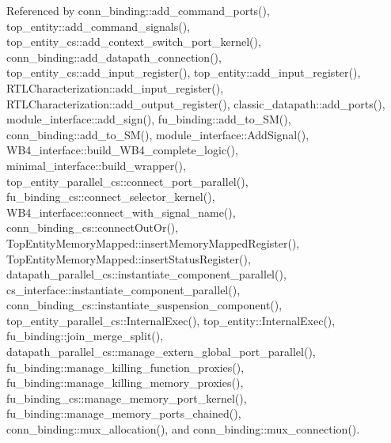 Referenced by conn\+\_\+binding\+::add\+\_\+command\+\_\+ports(), top\+\_\+entity\+::add\+\_\+command\+\_\+signals(), top\+\_\+entity\+\_\+cs\+::add\+\_\+context\+\_\+switch\+\_\+port\+\_\+kernel(), conn\+\_\+binding\+::add\+\_\+datapath\+\_\+connection(), top\+\_\+entity\+\_\+cs\+::add\+\_\+input\+\_\+register(), top\+\_\+entity\+::add\+\_\+input\+\_\+register(), R\+T\+L\+Characterization\+::add\+\_\+input\+\_\+register(), R\+T\+L\+Characterization\+::add\+\_\+output\+\_\+register(), classic\+\_\+datapath\+::add\+\_\+ports(), module\+\_\+interface\+::add\+\_\+sign(), fu\+\_\+binding\+::add\+\_\+to\+\_\+\+S\+M(), conn\+\_\+binding\+::add\+\_\+to\+\_\+\+S\+M(), module\+\_\+interface\+::\+Add\+Signal(), W\+B4\+\_\+interface\+::build\+\_\+\+W\+B4\+\_\+complete\+\_\+logic(), minimal\+\_\+interface\+::build\+\_\+wrapper(), top\+\_\+entity\+\_\+parallel\+\_\+cs\+::connect\+\_\+port\+\_\+parallel(), fu\+\_\+binding\+\_\+cs\+::connect\+\_\+selector\+\_\+kernel(), W\+B4\+\_\+interface\+::connect\+\_\+with\+\_\+signal\+\_\+name(), conn\+\_\+binding\+\_\+cs\+::connect\+Out\+Or(), Top\+Entity\+Memory\+Mapped\+::insert\+Memory\+Mapped\+Register(), Top\+Entity\+Memory\+Mapped\+::insert\+Status\+Register(), datapath\+\_\+parallel\+\_\+cs\+::instantiate\+\_\+component\+\_\+parallel(), cs\+\_\+interface\+::instantiate\+\_\+component\+\_\+parallel(), conn\+\_\+binding\+\_\+cs\+::instantiate\+\_\+suspension\+\_\+component(), top\+\_\+entity\+\_\+parallel\+\_\+cs\+::\+Internal\+Exec(), top\+\_\+entity\+::\+Internal\+Exec(), fu\+\_\+binding\+::join\+\_\+merge\+\_\+split(), datapath\+\_\+parallel\+\_\+cs\+::manage\+\_\+extern\+\_\+global\+\_\+port\+\_\+parallel(), fu\+\_\+binding\+::manage\+\_\+killing\+\_\+function\+\_\+proxies(), fu\+\_\+binding\+::manage\+\_\+killing\+\_\+memory\+\_\+proxies(), fu\+\_\+binding\+\_\+cs\+::manage\+\_\+memory\+\_\+port\+\_\+kernel(), fu\+\_\+binding\+::manage\+\_\+memory\+\_\+ports\+\_\+chained(), conn\+\_\+binding\+::mux\+\_\+allocation(), and conn\+\_\+binding\+::mux\+\_\+connection().

